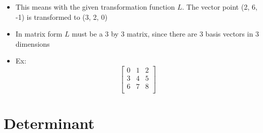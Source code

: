 \documentclass[a4paper]{article}
\begin{document}
\begin{itemize}
	\item This means with the given transformation function
	      $L$. The vector point (2, 6, -1) is transformed
	      to (3, 2, 0)
	\item In matrix form $L$ must be a 3 by 3 matrix, since
	      there are 3 basis vectors in 3 dimensions
	\item Ex:
	      \[
		      \begin{bmatrix} 0 & 1 & 2 \\
                3 & 4 & 5 \\
                6 & 7 & 8 \\\end{bmatrix}
	      \]
\end{itemize}

\newpage
\section{Determinant}
\end{document}
